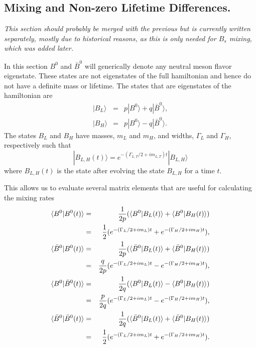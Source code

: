 \subsection{Mixing and Non-zero Lifetime Differences.}

{\it This section should probably be merged with the previous but 
is currently written separately, mostly due to historical reasons, as
this is only needed for $B_s$ mixing, which was added later.}

In this section $B^0$ and $\bar B^0$ will generically denote any
neutral meson flavor eigenstate. These states are not eigenstates
of the full hamiltonian and hence do not have a definite mass or
lifetime. The states that are eigenstates of the hamiltonian are
\begin{eqnarray}
|B_L\rangle & = & p|B^0\rangle +q|\bar B^0\rangle, \\
|B_H\rangle & = & p|B^0\rangle -q|\bar B^0\rangle.
\end{eqnarray}
The states $B_L$ and $B_H$ have masses, $m_L$ and $m_H$, and widths, $\Gamma_L$
and $\Gamma_H$, respectively such that 
\begin{equation}
|B_{L,H}(t)\rangle=e^{-(\Gamma_{L,T}/2+im_{L,T})t}|B_{L,H}\rangle
\end{equation}
where $B_{L,H}(t)$ is the state after evolving the state $B_{L,H}$ for
a time $t$.

This allows us to evaluate several matrix elements that are useful for
calculating the mixing rates
\begin{eqnarray}
\langle B^0|B^0(t)\rangle & = & {1\over 2p}(\langle B^0|B_L(t)\rangle
                                           +\langle B^0|B_H(t)\rangle)\nonumber\\
                          & = & {1\over 2}(e^{-(\Gamma_L/2+im_L)t}
                                          +e^{-(\Gamma_H/2+im_H)t}),\\
\langle \bar B^0|B^0(t)\rangle & = & {1\over 2p}(\langle \bar B^0|B_L(t)\rangle
                                           +\langle \bar B^0|B_H(t)\rangle)\nonumber\\
                          & = & {q\over 2p}(e^{-(\Gamma_L/2+im_L)t}
                                          -e^{-(\Gamma_H/2+im_H)t}),\\
\langle B^0|\bar B^0(t)\rangle & = & {1\over 2q}(\langle B^0|B_L(t)\rangle
                                           -\langle B^0|B_H(t)\rangle)\nonumber\\
                          & = & {p\over 2q}(e^{-(\Gamma_L/2+im_L)t}
                                          -e^{-(\Gamma_H/2+im_H)t}),\\
\langle \bar B^0|\bar B^0(t)\rangle & = & {1\over 2q}(\langle \bar B^0|B_L(t)\rangle
                                           +\langle \bar B^0|B_H(t)\rangle)\nonumber\\
                          & = & {1\over 2}(e^{-(\Gamma_L/2+im_L)t}
                                          +e^{-(\Gamma_H/2+im_H)t}).
\end{eqnarray}

